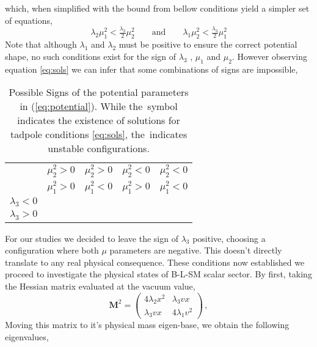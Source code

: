%
which, when simplified with the bound from bellow conditions yield a simpler set of equations,
%
\begin{equation}
\lambda_2 \mu_1^2 < \tfrac{\lambda_3}{2} \mu_2^2 
\qquad
\text{and}
\qquad
\lambda_1 \mu_2^2 < \tfrac{\lambda_3}{2} \mu_1^2
\label{eq:sols}
\end{equation}
%
Note that although $\lambda_1$ and $\lambda_2$ must be positive to ensure the correct potential shape, no such conditions exist for the sign of $\lambda_3$ , $\mu_1$ and $\mu_2$. However observing equation \ref{eq:sols} we can infer that some combinations of signs are impossible, 
%
\begin{table}[htb!]
	\begin{center}
		\begin{tabular}{|ccccc|}
			\hline  
			& $\mu_2^2 > 0$ & $\mu_2^2 > 0$ & $\mu_2^2 < 0$ & $\mu_2^2 < 0$  	\\
			& $\mu_1^2 > 0$ & $\mu_1^2 < 0$ & $\mu_1^2 > 0$ & $\mu_1^2 < 0$  	\\        
			\hline
			$\lambda_3 < 0 $     			    							& \xmark		& \checkmark	&	\checkmark & \checkmark	\\
			$\lambda_3 > 0$     			    							& \xmark		& \xmark	&	\xmark &  \checkmark \\
			\hline
		\end{tabular} 
		\caption{Possible Signs of the potential parameters in (\ref{eq:potential}). 
While the \checkmark\,symbol indicates the existence of solutions for tadpole conditions \eqref{eq:sols}, the \xmark\,indicates unstable configurations.}
		\label{tab:signs}  
	\end{center}
\end{table} 
%
For our studies we decided to leave the sign of $\lambda_3$ positive, choosing a configuration where both $\mu$ parameters are negative. This doesn't directly translate to any real physical consequence.  
%
These conditions now established we proceed to investigate the physical states of B-L-SM scalar sector. By first, taking the Hessian matrix evaluated at the vacuum value, 
%
\begin{equation}
\mathbf{M}^2 =
\begin{pmatrix}
4 \lambda_2 x^2 & \lambda_3 v x \\ 
\lambda_3 v x   & 4 \lambda_1 v^2 
\end{pmatrix}\,,
\label{eq:hess}
\end{equation}
% 
Moving this matrix to it's physical mass eigen-base, we obtain the following eigenvalues,
%
